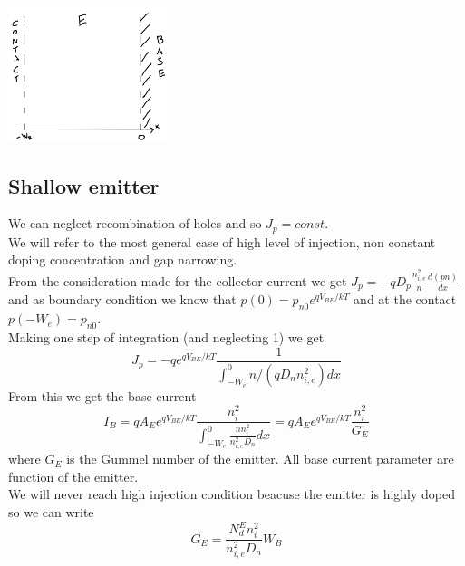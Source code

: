 \centering
\includegraphics[width=0.35\textwidth]{emi.png}\\
\raggedright

\subsection{Shallow emitter}
We can neglect recombination of holes and so $J_p=const$.\\
We will refer to the most general case of high level of injection, non constant doping concentration and gap narrowing.\\
From the consideration made for the collector current we get $J_p=-qD_p \frac{n_{i,e}^2}{n}\frac{d(pn)}{dx}$ and as boundary condition we know that $p(0)=p_{n0}e^{qV_{BE}/kT}$ and at the contact $p(-W_e)=p_{n0}$.\\
Making one step of integration (and neglecting 1) we get 
\begin{equation}
J_p=-qe^{qV_{BE}/kT}\frac{1}{\int_{-W_e}^0 n/(qD_nn_{i,e}^2) dx}
\end{equation}
From this we get the base current
\begin{equation}
I_B= qA_E e^{qV_{BE}/kT}\frac{n_i^2}{\int_{-W_e}^{0}\frac{n n_i^2}{n_{i,e}^2D_n} dx}=qA_Ee^{qV_{BE}/kT}\frac{n_i^2}{G_E}
\end{equation}
where $G_E$ is the Gummel number of the emitter. All base current parameter are function of the emitter.\\
We will never reach high injection condition beacuse the emitter is highly doped so we can write
\begin{equation}
G_E= \frac{N_d^En_i^2}{n_{i,e}^2D_n}W_B 
\end{equation}

